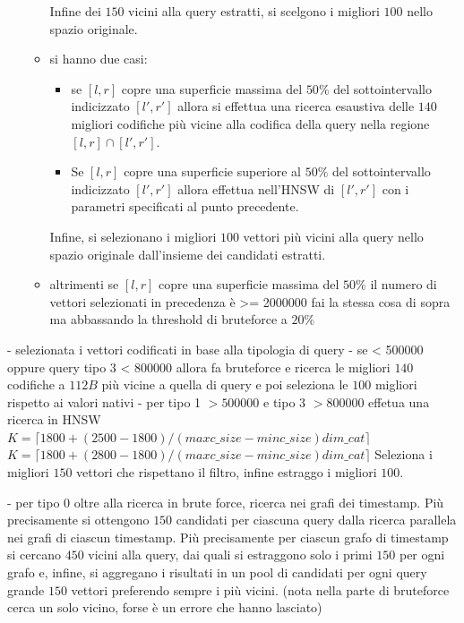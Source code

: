 \begin{itemize}
\begin{itemize}
\begin{itemize}
        \end{itemize}
        Infine dei $150$ vicini alla query estratti, si scelgono i migliori $100$ 
        nello spazio originale.
        \item si hanno due casi:
        \begin{itemize}
            \item se $[l,r]$ copre una superficie massima del $50\%$ del sottointervallo
            indicizzato $ [l',r']$ allora si effettua una ricerca esaustiva delle $140$ 
            migliori codifiche più vicine alla codifica della query nella regione $[l,r] \cap [l',r']$.
            \item Se $[l,r]$ copre una superficie superiore al $50\%$ del sottointervallo
            indicizzato $ [l',r']$ allora effettua nell'HNSW di $ [l',r']$ con i parametri 
            specificati al punto precedente.
        \end{itemize} 
        Infine, si selezionano i migliori $100$ vettori più vicini alla query nello 
        spazio originale dall'insieme dei candidati estratti.
        \item altrimenti se $[l,r]$ copre una superficie massima del $50\%$ il numero di vettori selezionati in precedenza è >= 2000000 fai la stessa 
        cosa di sopra ma abbassando la threshold di bruteforce a  $20\%$
    \end{itemize}
\end{itemize}




- selezionata i vettori codificati in base alla tipologia di query
- se < 500000 oppure query tipo 3 < 800000 allora fa bruteforce e ricerca le migliori $140$ codifiche a $112 B$
più vicine a quella di query e poi seleziona le $100$ migliori rispetto ai valori 
nativi
- per tipo 1 $> 500000$ e tipo 3 $> 800000$  effetua una ricerca in HNSW $K= \lceil1800+(2500-1800)/(maxc\_size - minc\_size)dim\_cat\rceil$
 $K= \lceil1800+(2800-1800)/(maxc\_size - minc\_size)dim\_cat\rceil$
 Seleziona i migliori $150$ vettori che rispettano il filtro, infine estraggo i 
 migliori $100$.

- per tipo 0 oltre alla ricerca in brute force, ricerca nei grafi dei timestamp.
 Più precisamente si ottengono $150$ candidati per ciascuna query dalla ricerca 
 parallela nei grafi di ciascun timestamp. Più precisamente per ciascun grafo di 
 timestamp si cercano $450$ vicini alla query, dai quali si estraggono solo i primi 
 $150$ per ogni grafo e, infine, si aggregano i risultati in un pool 
 di candidati per ogni query grande $150$ vettori preferendo sempre i più vicini.
 (nota nella parte di bruteforce cerca un solo vicino, forse è un errore che hanno 
 lasciato)

